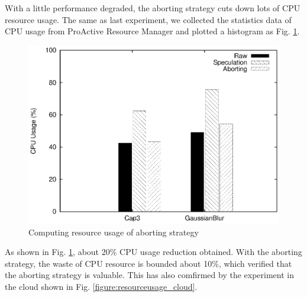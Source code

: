 With a little performance degraded, the aborting strategy cuts down lots of CPU resource
usage. The same as last experiment, we collected the statistics data of CPU usage from
ProActive Resource Manager and plotted a histogram as Fig.
\ref{figure:abort_resourceusage}.

\begin{figure}
\centering
\includegraphics[width=0.9\columnwidth]{figures/abort_resource_usage.eps}
\caption{Computing resource usage of aborting strategy}
\label{figure:abort_resourceusage}
\end{figure}

As shown in Fig. \ref{figure:abort_resourceusage}, about 20\% CPU usage reduction
obtained. With the aborting strategy, the waste of CPU resource is bounded about 10\%,
which verified that the aborting strategy is valuable. This has also comfirmed by the
experiment in the cloud shown in Fig. \ref{figure:resourceusage_cloud}. 
